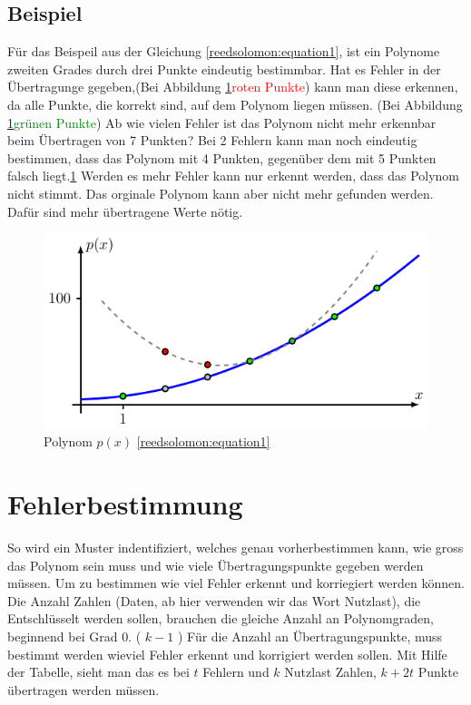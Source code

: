 \subsection{Beispiel}
Für das Beispeil aus der Gleichung \eqref{reedsolomon:equation1},
ist ein Polynome zweiten Grades durch drei Punkte eindeutig bestimmbar.
Hat es Fehler in der Übertragunge gegeben,(Bei Abbildung \ref{fig:polynom}\textcolor{red}{roten Punkte}) kann man diese erkennen,
da alle Punkte, die korrekt sind, auf dem Polynom liegen müssen. 
(Bei Abbildung \ref{fig:polynom}\textcolor{green}{grünen Punkte})
Ab wie vielen Fehler ist das Polynom nicht mehr erkennbar beim Übertragen von 7 Punkten?
Bei 2 Fehlern kann man noch eindeutig bestimmen, dass das Polynom mit 4 Punkten,
gegenüber dem mit 5 Punkten falsch liegt.\ref{fig:polynom}
Werden es mehr Fehler kann nur erkennt werden, dass das Polynom nicht stimmt.
Das orginale Polynom kann aber nicht mehr gefunden werden.
Dafür sind mehr übertragene Werte nötig.

\begin{figure}
	\centering
	\includegraphics[width=\textwidth]{papers/reedsolomon/figures/polynom2}
	\caption{Polynom $p(x)$ \eqref{reedsolomon:equation1}}
	\label{fig:polynom}
\end{figure}

\section{Fehlerbestimmung
\label{reedsolomon:section:Fehlerbestimmmung}}
So wird ein Muster indentifiziert, welches genau vorherbestimmen kann,
wie gross das Polynom sein muss und wie viele Übertragungspunkte gegeben werden müssen.
Um zu bestimmen wie viel Fehler erkennt und korriegiert werden können.
Die Anzahl Zahlen (Daten, ab hier verwenden wir das Wort Nutzlast),
die Entschlüsselt werden sollen, brauchen die gleiche Anzahl an  Polynomgraden, beginnend bei Grad 0. ( \( k-1 \) )
Für die Anzahl an Übertragungspunkte, muss bestimmt werden wieviel Fehler erkennt und korrigiert werden sollen.
Mit Hilfe der Tabelle, sieht man das es bei $t$ Fehlern und $k$ Nutzlast Zahlen,
$k+2t$ Punkte übertragen werden müssen.


